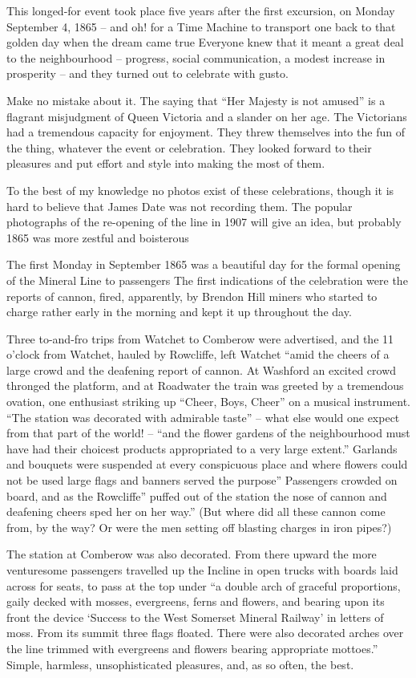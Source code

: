 \documentclass[11pt]{book}
\begin{document}
This longed-for event took place five years after the first excursion, on Monday September 4, 1865 – and oh! for a Time Machine to transport one back to that golden day when the dream came true Everyone knew that it meant a great deal to the neighbourhood  -- progress, social communication, a modest increase in prosperity – and they turned out to celebrate with gusto.

Make no mistake about it. The saying that “Her Majesty is not amused” is a flagrant misjudgment of Queen Victoria and a slander on her age. The Victorians had a tremendous capacity for enjoyment. They threw themselves into the fun of the thing, whatever the event or celebration. They looked forward to their pleasures and put effort and style into making the most of them.

To the best of my knowledge no photos exist of these celebrations, though it is hard to believe that James Date was not recording them. The popular photographs of the re-opening of the line in 1907 will give an idea, but probably 1865 was more zestful and boisterous

The first Monday in September 1865 was a beautiful day for the formal opening of the Mineral Line to passengers The first indications of the celebration were the reports of cannon, fired, apparently, by Brendon Hill miners who started to charge rather early in the morning and kept it up  throughout the day.

Three to-and-fro trips from Watchet to Comberow were advertised, and the 11 o’clock from Watchet,   hauled by Rowcliffe,  left Watchet “amid the cheers of  a large crowd and the deafening report  of cannon. At Washford an excited crowd thronged the platform, and at Roadwater the train was greeted by a tremendous ovation, one enthusiast striking up “Cheer, Boys, Cheer” on a musical instrument. “The station was decorated with admirable taste” – what else would one expect from that part of the world!  – “and the flower gardens of the neighbourhood must have had their choicest products appropriated  to a very large extent.” Garlands and bouquets were suspended at every conspicuous place  and where flowers could not be used large flags and banners served the purpose” Passengers crowded on board, and as the Rowcliffe” puffed out of the station the nose of cannon and deafening cheers sped her on her way.” (But where did all these cannon come from, by the way? Or were the men setting off blasting charges in iron pipes?)

The station at Comberow was also decorated. From there upward the more venturesome passengers travelled up the Incline in open trucks with boards laid across for seats, to pass at the top under “a double arch of graceful proportions, gaily decked with mosses, evergreens, ferns  and flowers, and bearing upon its front the device  ‘Success to the West Somerset Mineral Railway’ in letters of moss. From its summit three flags floated.  There were also decorated arches over the line trimmed with evergreens and flowers bearing appropriate mottoes.” Simple, harmless, unsophisticated pleasures, and, as so often, the best.
\end{document}
